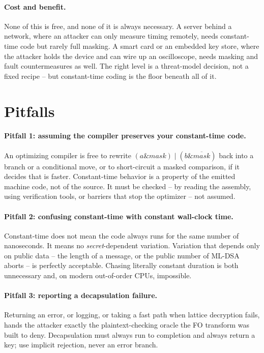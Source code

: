 \paragraph{Cost and benefit.}
None of this is free, and none of it is always necessary. A server behind a network,
where an attacker can only measure timing remotely, needs constant-time code but rarely
full masking. A smart card or an embedded key store, where the attacker holds the
device and can wire up an oscilloscope, needs masking and fault countermeasures as
well. The right level is a threat-model decision, not a fixed recipe -- but
constant-time coding is the floor beneath all of it.

\section{Pitfalls}

\paragraph{Pitfall 1: assuming the compiler preserves your constant-time code.}
An optimizing compiler is free to rewrite $(a \mathbin{\&} mask)\mathbin{|}(b
\mathbin{\&}\overline{mask})$ back into a branch or a conditional move, or to
short-circuit a masked comparison, if it decides that is faster. Constant-time
behavior is a property of the emitted machine code, not of the source. It must be
checked -- by reading the assembly, using verification tools, or barriers that stop the
optimizer -- not assumed.

\paragraph{Pitfall 2: confusing constant-time with constant wall-clock time.}
Constant-time does not mean the code always runs for the same number of nanoseconds.
It means no \emph{secret}-dependent variation. Variation that depends only on public
data -- the length of a message, or the public number of ML-DSA aborts -- is perfectly
acceptable. Chasing literally constant duration is both unnecessary and, on modern
out-of-order CPUs, impossible.

\paragraph{Pitfall 3: reporting a decapsulation failure.}
Returning an error, or logging, or taking a fast path when lattice decryption fails,
hands the attacker exactly the plaintext-checking oracle the FO transform was built to
deny. Decapsulation must always run to completion and always return a key; use implicit
rejection, never an error branch.

